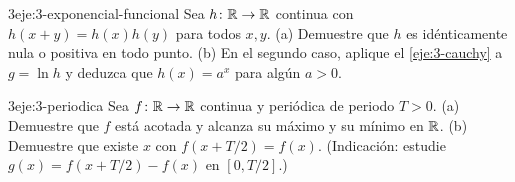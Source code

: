 \begin{ejercicio}{3}{eje:3-exponencial-funcional}
Sea $h\colon\mathbb{R}\to\mathbb{R}$ continua con $h(x+y)=h(x)h(y)$ para todos $x,y$. (a) Demuestre que $h$ es idénticamente nula o positiva en todo punto. (b) En el segundo caso, aplique el \cref{eje:3-cauchy} a $g=\ln h$ y deduzca que $h(x)=a^{x}$ para algún $a>0$.
\end{ejercicio}

\begin{ejercicio}{3}{eje:3-periodica}
Sea $f\colon\mathbb{R}\to\mathbb{R}$ continua y periódica de periodo $T>0$. (a) Demuestre que $f$ está acotada y alcanza su máximo y su mínimo en $\mathbb{R}$. (b) Demuestre que existe $x$ con $f(x+T/2)=f(x)$. (Indicación: estudie $g(x)=f(x+T/2)-f(x)$ en $[0,T/2]$.)
\end{ejercicio}
